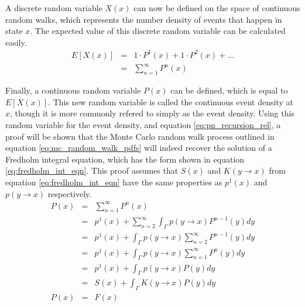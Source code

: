 A discrete random variable $X(x)$ can now be defined on the space of continuous
random walks, which represents the number density of events that happen in 
state $x$. The expected value of this discrete random variable can be calculated
easily.
\begin{eqnarray}
  E[X(x)] & = & 1 \cdot P^1(x) + 1 \cdot P^2(x) + \ldots \nonumber \\
  & = & \sum_{n=1}^{\infty} P^n(x)
  \label{eq:expec_coll_dens}
\end{eqnarray}

Finally, a continuous random variable $P(x)$ can be defined, which is equal to
$E[X(x)]$. This new random variable is called the continuous event density 
at $x$, though it is more commonly refered to simply as the event density.
Using this random variable for the event density, and equation
\ref{eq:pn_recursion_rel}, a proof will be shown that the Monte Carlo random
walk process outlined in equation \ref{eq:mc_random_walk_pdfs} will indeed
recover the solution of a Fredholm integral equation, which has the form shown
in equation \ref{eq:fredholm_int_eqn}. This proof assumes that $S(x)$ and
$K(y \to x)$ from equation \ref{eq:fredholm_int_eqn} have the same properties 
as $p^1(x)$ and $p(y \to x)$ respectively. 
\begin{eqnarray}
  P(x) & = & \sum_{n=1}^{\infty} P^n(x) \nonumber \\
  & = & p^1(x) + \sum_{n=2}^{\infty} \int_{\Gamma} p(y \to x) P^{n-1}(y)dy \nonumber\\
  & = & p^1(x) + \int_{\Gamma} p(y \to x) \sum_{n=2}^{\infty} P^{n-1}(y)dy \nonumber\\
  & = & p^1(x) + \int_{\Gamma} p(y \to x) \sum_{n=1}^{\infty} P^{n}(y)dy \nonumber\\
  & = & p^1(x) + \int_{\Gamma} p(y \to x) P(y)dy \nonumber \\
  & = & S(x) + \int_{\Gamma} K(y \to x) P(y)dy \nonumber \\
  P(x) & = & F(x) \nonumber
\end{eqnarray}


